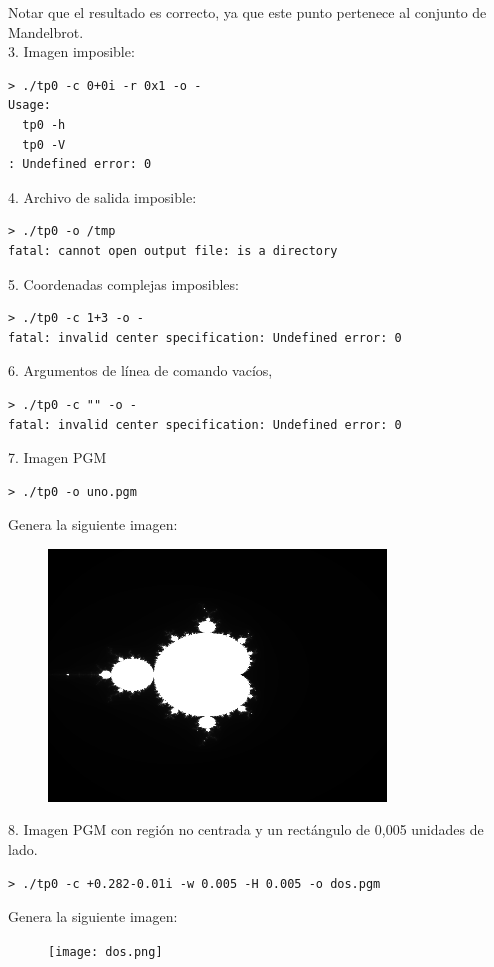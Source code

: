 \documentclass[a4paper,10pt]{article}
\begin{document}
Notar que el resultado es correcto, ya que este punto pertenece al conjunto de Mandelbrot.
\\
3. Imagen imposible:
\begin{verbatim}
> ./tp0 -c 0+0i -r 0x1 -o -
Usage:
  tp0 -h
  tp0 -V
: Undefined error: 0
\end{verbatim}


4. Archivo de salida imposible:
\begin{verbatim}
> ./tp0 -o /tmp
fatal: cannot open output file: is a directory
\end{verbatim}


5. Coordenadas complejas imposibles:
\begin{verbatim}
> ./tp0 -c 1+3 -o -
fatal: invalid center specification: Undefined error: 0
\end{verbatim}


6. Argumentos de l\'inea de comando vac\'ios,
\begin{verbatim}
> ./tp0 -c "" -o -
fatal: invalid center specification: Undefined error: 0
\end{verbatim}


7. Imagen PGM
\begin{verbatim}
> ./tp0 -o uno.pgm
\end{verbatim}
Genera la siguiente imagen:
\begin{figure}
  \begin{center}
    \includegraphics[width=0.8\textwidth]{uno.png}
    \label{fig:Region barrida por defecto}
    \caption{}
  \end{center}
\end{figure}



8. Imagen PGM con regi\'on no centrada y un rect\'angulo de 0,005 unidades de lado.
\begin{verbatim}
> ./tp0 -c +0.282-0.01i -w 0.005 -H 0.005 -o dos.pgm
\end{verbatim}
Genera la siguiente imagen:
\begin{figure}
  \begin{center}
    \texttt{[image: dos.png]}
    \label{fig:Region comprendida entre 0,2795 - 0,0075i y 0,2845 - 0,0125i}
    \caption{}
  \end{center}
\end{figure}
\end{document}

